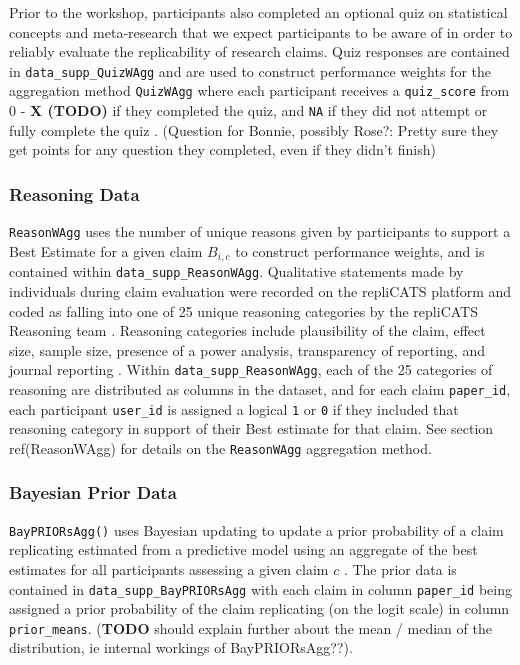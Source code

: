 \documentclass[article]{jss}
\begin{document}
Prior to the workshop, participants also completed an optional quiz on
statistical concepts and meta-research that we expect participants to be
aware of in order to reliably evaluate the replicability of research
claims. Quiz responses are contained in \texttt{data\_supp\_QuizWAgg}
and are used to construct performance weights for the aggregation method
\texttt{QuizWAgg} where each participant receives a \texttt{quiz\_score}
from 0 - \textbf{X (TODO)} if they completed the quiz, and \texttt{NA}
if they did not attempt or fully complete the quiz \citep[see][ for
further details]{Hanea2021}. (Question for Bonnie, possibly Rose?:
Pretty sure they get points for any question they completed, even if
they didn't finish)

\hypertarget{sec-reasonwagg-supplementary-data}{%
\subsubsection{Reasoning Data}\label{sec-reasonwagg-supplementary-data}}

\texttt{ReasonWAgg} uses the number of unique reasons given by
participants to support a Best Estimate for a given claim \(B_{i,c}\) to
construct performance weights, and is contained within
\texttt{data\_supp\_ReasonWAgg}. Qualitative statements made by
individuals during claim evaluation were recorded on the repliCATS
platform \citep{Pearson2021} and coded as falling into one of 25 unique
reasoning categories by the repliCATS Reasoning team
\citep{Wintle:2021}. Reasoning categories include plausibility of the
claim, effect size, sample size, presence of a power analysis,
transparency of reporting, and journal reporting \citep{Hanea2021}.
Within \texttt{data\_supp\_ReasonWAgg}, each of the 25 categories of
reasoning are distributed as columns in the dataset, and for each claim
\texttt{paper\_id}, each participant \texttt{user\_id} is assigned a
logical \texttt{1} or \texttt{0} if they included that reasoning
category in support of their Best estimate for that claim. See section
ref(ReasonWAgg) for details on the \texttt{ReasonWAgg} aggregation
method.

\hypertarget{sec-bayesian-supplementary-data}{%
\subsubsection{Bayesian Prior
Data}\label{sec-bayesian-supplementary-data}}

\texttt{BayPRIORsAgg()} uses Bayesian updating to update a prior
probability of a claim replicating estimated from a predictive model
\citep{Gould2021a} using an aggregate of the best estimates for all
participants assessing a given claim \(c\) \citep{Hanea2021}. The prior
data is contained in \texttt{data\_supp\_BayPRIORsAgg} with each claim
in column \texttt{paper\_id} being assigned a prior probability of the
claim replicating (on the logit scale) in column \texttt{prior\_means}.
(\textbf{TODO} should explain further about the mean / median of the
distribution, ie internal workings of BayPRIORsAgg??).
\end{document}
